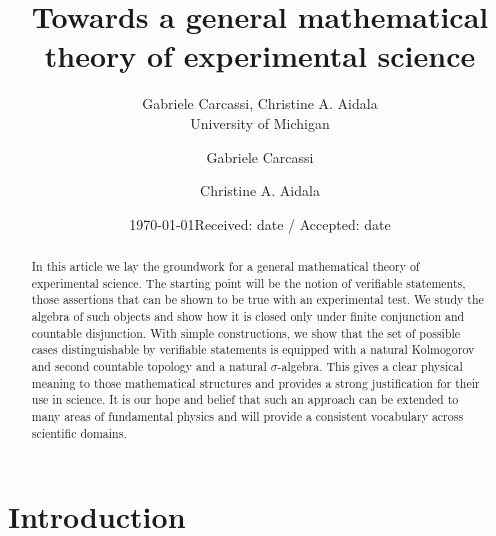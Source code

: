 \documentclass[letterpaper]{article}
\theoremstyle{plain}%
\theoremstyle{definition}
\theoremstyle{remark}
\numberwithin{equation}{section}
\begin{document}
\title{Towards a general mathematical theory of experimental science}


\ifarchive
\author{Gabriele Carcassi, Christine A. Aidala \\ University of Michigan}
\date{\today}
\else
\author{Gabriele Carcassi \and Christine A. Aidala}
\date{Received: date / Accepted: date}
\fi

\maketitle

\begin{abstract}
	In this article we lay the groundwork for a general mathematical theory of experimental science. The starting point will be the notion of verifiable statements, those assertions that can be shown to be true with an experimental test. We study the algebra of such objects and show how it is closed only under finite conjunction and countable disjunction. With simple constructions, we show that the set of possible cases distinguishable by verifiable statements is equipped with a natural Kolmogorov and second countable topology and a natural $\sigma$-algebra. This gives a clear physical meaning to those mathematical structures and provides a strong justification for their use in science. It is our hope and belief that such an approach can be extended to many areas of fundamental physics and will provide a consistent vocabulary across scientific domains.
\end{abstract}



\section{Introduction}
\end{document}
